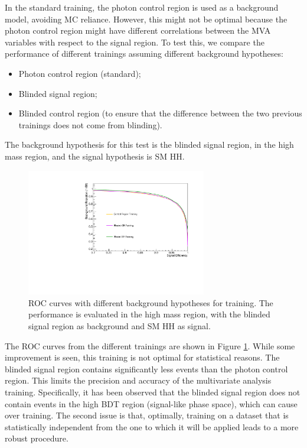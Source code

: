 In the standard training, the photon control region is used as a background model, avoiding MC reliance. 
However, this might not be optimal because the photon control region might have different correlations between the MVA variables with respect to the signal region. 
To test this, we compare the performance of different trainings assuming different background hypotheses: 
\begin{itemize}
\item Photon control region (standard);
\item Blinded signal region;
\item Blinded control region (to ensure that the difference between the two previous trainings does not come from blinding).
\end{itemize}
The background hypothesis for this test is the blinded signal region, in the high mass region, and the signal hypothesis is SM HH. 

\begin{figure}[h]
  \centering
  \includegraphics[width=0.7\textwidth]{figures/sec-cats/mva/ROC_BCR}\hfil
  \caption{ROC curves with different background hypotheses for training. The performance is evaluated in the high mass region, with the blinded signal region as background and SM HH as signal.}
  \label{fig:mva_cc_background}
\end{figure}

The ROC curves from the different trainings are shown in Figure \ref{fig:mva_cc_background}. 
While some improvement is seen, this training is not optimal for statistical reasons. 
The blinded signal region contains significantly less events than the photon control region. 
This limits the precision and accuracy of the multivariate analysis training. 
Specifically, it has been observed that the blinded signal region does not contain events in the high BDT region (signal-like phase space), which can cause over training. 
The second issue is that, optimally, training on a dataset that is statistically independent from the one to which it will be applied leads to a more robust procedure. 



